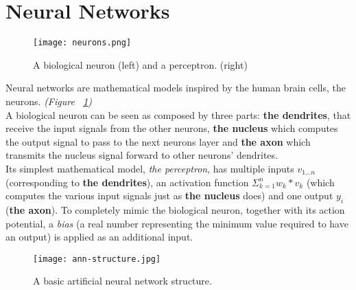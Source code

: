 \documentclass[../main.tex]{subfiles}
\begin{document}
\vspace{5mm}
\section{Neural Networks}
\begin{figure}[!b]
  \centering
  \texttt{[image: neurons.png]}
  \caption{A biological neuron (left) and a perceptron. (right)}
  \label{fig:neuron}
\end{figure}


Neural networks are mathematical models inspired by the human brain cells, the neurons. \textit{(Figure ~\ref{fig:neuron})} \\ 
A biological neuron can be seen as composed by three parts: \textbf{the dendrites}, that receive the input signals from the other neurons, \textbf{the nucleus} which computes the output signal to pass to the next neurons layer and \textbf{the axon} which transmits the nucleus signal forward to other neurons' dendrites. \\
Its simplest mathematical model, \textit{the perceptron}, has multiple inputs $v_{1...n}$ (corresponding to \textbf{the dendrites}), an activation function $\Sigma_{k=1}^n w_k*v_k$ (which computes the various input signals just as \textbf{the nucleus} does) and one output $y_i$ (\textbf{the axon}). To completely mimic the biological neuron, together with its action potential, a \textit{bias} (a real number representing the minimum value required to have an output) is applied as an additional input.


\begin{figure}[!b]
  \centering
  \texttt{[image: ann-structure.jpg]}
  \caption{A basic artificial neural network structure.}
  \label{fig:ann-structure}
\end{figure}
\end{document}
